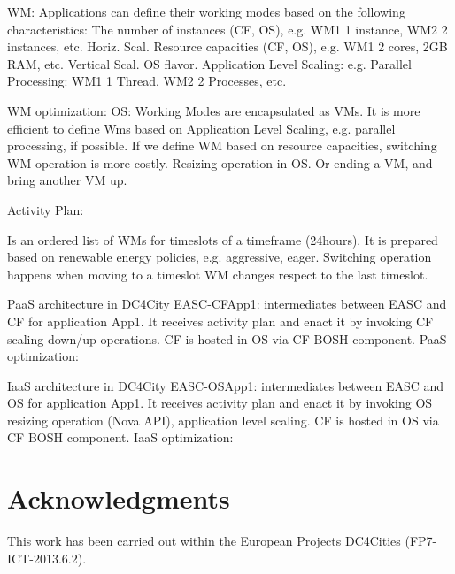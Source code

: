 \documentclass[10pt, conference, compsocconf]{IEEEtran}
\begin{document}
WM:
Applications can define their working modes based on the following characteristics:
The number of instances (CF, OS), e.g. WM1 1 instance, WM2 2 instances, etc. Horiz. Scal.
Resource capacities (CF, OS), e.g. WM1 2 cores, 2GB RAM, etc. Vertical Scal. OS flavor.
Application Level Scaling: e.g. Parallel Processing: WM1 1 Thread, WM2 2 Processes, etc.

WM optimization:
OS: Working Modes are encapsulated as VMs.
It is more efficient to define Wms based on Application Level Scaling, e.g. parallel processing, if possible.
If we define WM based on resource capacities,  switching WM operation is more costly.
Resizing operation in OS.
Or ending a VM, and bring another VM up.

Activity Plan:

Is an ordered list of WMs for timeslots of a timeframe (24hours).
It is prepared based on renewable energy policies, e.g. aggressive, eager.
Switching operation happens when moving to a timeslot WM changes respect to the last timeslot.

PaaS architecture in DC4City
EASC-CFApp1: intermediates between EASC and CF for application App1. It receives activity plan and enact it by invoking CF scaling down/up operations.
CF is hosted in OS via CF BOSH component.
PaaS optimization:

IaaS architecture in DC4City
EASC-OSApp1: intermediates between EASC and OS for application App1. It receives activity plan and enact it by invoking OS resizing operation (Nova API), application level scaling.
CF is hosted in OS via CF BOSH component.
IaaS optimization:





\section*{Acknowledgments}

This work has been carried out within the European Projects DC4Cities (FP7-ICT-2013.6.2).

%
%
\end{document}
